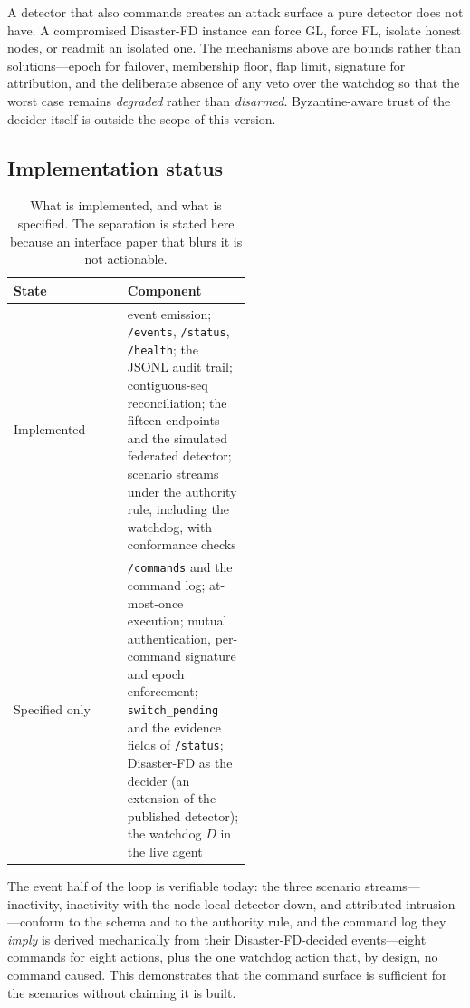 A detector that also commands creates an attack surface a pure detector does not have. A
compromised Disaster-FD instance can force GL, force FL, isolate honest nodes, or readmit an
isolated one. The mechanisms above are bounds rather than solutions---epoch for failover,
membership floor, flap limit, signature for attribution, and the deliberate absence of any
veto over the watchdog so that the worst case remains \emph{degraded} rather than
\emph{disarmed}. Byzantine-aware trust of the decider itself is outside the scope of this
version.

\subsection{Implementation status}
\label{sec:api-status}

\begin{table}[htbp]
\centering
\caption{What is implemented, and what is specified. The separation is stated here because
an interface paper that blurs it is not actionable.}
\label{tab:api-status}
\begin{tabular}{@{}lp{0.52\linewidth}@{}}
\toprule
State & Component \\
\midrule
Implemented & event emission; \texttt{/events}, \texttt{/status}, \texttt{/health}; the
JSONL audit trail; contiguous-seq reconciliation; the fifteen endpoints and the simulated
federated detector; scenario streams under the authority rule, including the watchdog, with
conformance checks \\
Specified only & \texttt{/commands} and the command log; at-most-once execution; mutual
authentication, per-command signature and epoch enforcement; \texttt{switch\_pending} and
the evidence fields of \texttt{/status}; Disaster-FD as the decider (an extension of the
published detector); the watchdog $D$ in the live agent \\
\bottomrule
\end{tabular}
\end{table}

The event half of the loop is verifiable today: the three scenario streams---inactivity,
inactivity with the node-local detector down, and attributed intrusion---conform to the
schema and to the authority rule, and the command log they \emph{imply} is derived
mechanically from their Disaster-FD-decided events---eight commands for eight actions, plus
the one watchdog action that, by design, no command caused. This demonstrates that the
command surface is sufficient for the scenarios without claiming it is built.
